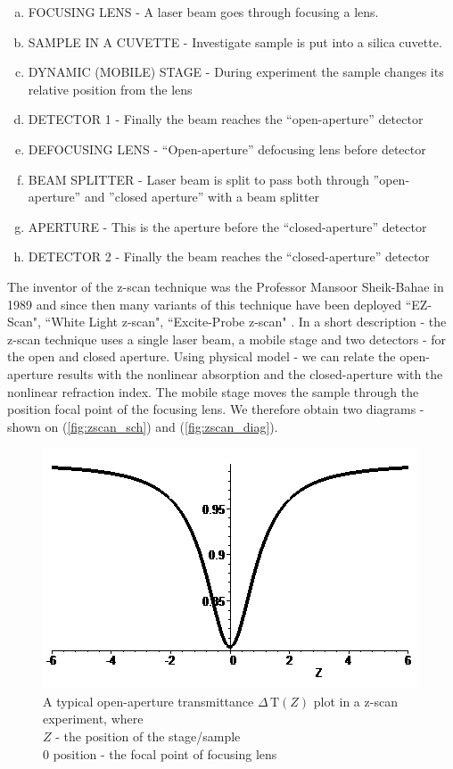\documentclass[12pt,twoside,a4paper]{article}
\numberwithin{equation}{subsection}
\numberwithin{figure}{subsection}
\begin{document}
\begin{enumerate}[(a)]
  \item FOCUSING LENS - A laser beam goes through focusing a lens.
  \item SAMPLE IN A CUVETTE - Investigate sample is put into a silica cuvette.
  \item DYNAMIC (MOBILE) STAGE - During experiment the sample changes its relative position from the lens
  \item DETECTOR 1 - Finally the beam reaches the ``open-aperture'' detector  
  \item DEFOCUSING LENS  - ``Open-aperture'' defocusing lens before detector
  \item BEAM SPLITTER - Laser beam is split to pass both through ''open-aperture'' and ''closed aperture'' with a beam splitter
  \item APERTURE - This is the aperture before the ``closed-aperture'' detector
  \item DETECTOR 2 - Finally the beam reaches the ``closed-aperture'' detector
\end{enumerate}


The inventor of the z-scan technique was the Professor Mansoor Sheik-Bahae in 1989 \cite{bahae_sensitive} and since then many variants of this
technique have been deployed ``EZ-Scan", ``White Light z-scan", ``Excite-Probe z-scan" \cite{newport_application}. In a short
description - the z-scan technique uses a single laser beam, a mobile stage and two detectors - for the open and closed aperture.
Using physical model - we can relate the open-aperture results with the nonlinear absorption and the closed-aperture with the
nonlinear refraction index. The mobile stage moves the sample through the position focal point of the focusing lens. We therefore obtain
two diagrams - shown on (\ref{fig:zscan_sch}) and (\ref{fig:zscan_diag}).


\begin{figure}
  \includegraphics{img/oa_plot.png}
  \caption{A typical open-aperture transmittance $\Delta \,\mathrm{T}(Z)$ plot in a z-scan experiment, where \\ 
  $Z$ - the position of the stage/sample \\ 
  $0$ position - the focal point of focusing lens 
  \label{fig:oa_plot}}
\end{figure}
\end{document}
